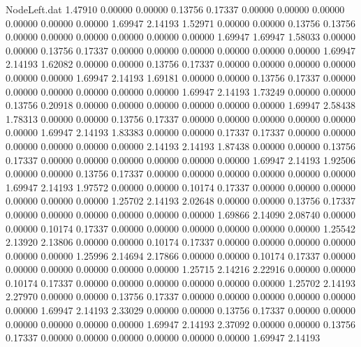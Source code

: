 \begin{filecontents}{NodeLeft.dat}
   1.47910    0.00000    0.00000     0.13756    0.17337    0.00000    0.00000    0.00000    0.00000    0.00000    0.00000    1.69947    2.14193
   1.52971    0.00000    0.00000     0.13756    0.13756    0.00000    0.00000    0.00000    0.00000    0.00000    0.00000    1.69947    1.69947
   1.58033    0.00000    0.00000     0.13756    0.17337    0.00000    0.00000    0.00000    0.00000    0.00000    0.00000    1.69947    2.14193
   1.62082    0.00000    0.00000     0.13756    0.17337    0.00000    0.00000    0.00000    0.00000    0.00000    0.00000    1.69947    2.14193
   1.69181    0.00000    0.00000     0.13756    0.17337    0.00000    0.00000    0.00000    0.00000    0.00000    0.00000    1.69947    2.14193
   1.73249    0.00000    0.00000     0.13756    0.20918    0.00000    0.00000    0.00000    0.00000    0.00000    0.00000    1.69947    2.58438
   1.78313    0.00000    0.00000     0.13756    0.17337    0.00000    0.00000    0.00000    0.00000    0.00000    0.00000    1.69947    2.14193
   1.83383    0.00000    0.00000     0.17337    0.17337    0.00000    0.00000    0.00000    0.00000    0.00000    0.00000    2.14193    2.14193
   1.87438    0.00000    0.00000     0.13756    0.17337    0.00000    0.00000    0.00000    0.00000    0.00000    0.00000    1.69947    2.14193
   1.92506    0.00000    0.00000     0.13756    0.17337    0.00000    0.00000    0.00000    0.00000    0.00000    0.00000    1.69947    2.14193
   1.97572    0.00000    0.00000     0.10174    0.17337    0.00000    0.00000    0.00000    0.00000    0.00000    0.00000    1.25702    2.14193
   2.02648    0.00000    0.00000     0.13756    0.17337    0.00000    0.00000    0.00000    0.00000    0.00000    0.00000    1.69866    2.14090
   2.08740    0.00000    0.00000     0.10174    0.17337    0.00000    0.00000    0.00000    0.00000    0.00000    0.00000    1.25542    2.13920
   2.13806    0.00000    0.00000     0.10174    0.17337    0.00000    0.00000    0.00000    0.00000    0.00000    0.00000    1.25996    2.14694
   2.17866    0.00000    0.00000     0.10174    0.17337    0.00000    0.00000    0.00000    0.00000    0.00000    0.00000    1.25715    2.14216
   2.22916    0.00000    0.00000     0.10174    0.17337    0.00000    0.00000    0.00000    0.00000    0.00000    0.00000    1.25702    2.14193
   2.27970    0.00000    0.00000     0.13756    0.17337    0.00000    0.00000    0.00000    0.00000    0.00000    0.00000    1.69947    2.14193
   2.33029    0.00000    0.00000     0.13756    0.17337    0.00000    0.00000    0.00000    0.00000    0.00000    0.00000    1.69947    2.14193
   2.37092    0.00000    0.00000     0.13756    0.17337    0.00000    0.00000    0.00000    0.00000    0.00000    0.00000    1.69947    2.14193

\end{filecontents}
